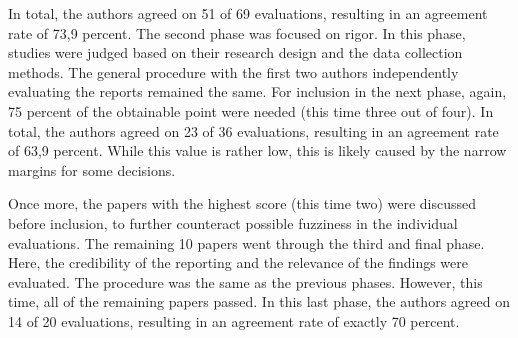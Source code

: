 \documentclass[a4paper,11pt,article,oneside]{memoir}
\begin{document}


In total, the authors agreed on 51 of 69 evaluations, resulting in an agreement rate of 73,9 percent. The second phase was focused on rigor. In this phase, studies were judged based on their research design and the data collection methods. The general procedure with the first two authors independently evaluating the reports remained the same. For inclusion in the next phase, again, 75 percent of the obtainable point were needed (this time three out of four). In total, the authors agreed on 23 of 36 evaluations, resulting in an agreement rate of 63,9 percent. While this value is rather low, this is likely caused by the narrow margins for some decisions. 

Once more, the papers with the highest score (this time two) were discussed before inclusion, to further counteract possible fuzziness in the individual evaluations.  The remaining 10 papers went through the third and final phase. Here, the credibility of the reporting and the relevance of the findings were evaluated. The procedure was the same as the previous phases. However, this time, all of the remaining papers passed. In this last phase, the authors agreed on 14 of 20 evaluations, resulting in an agreement rate of exactly 70 percent. 
\end{document}
